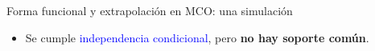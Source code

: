 \documentclass[10pt, xcolor=dvipsnames]{beamer}
\begin{document}
\begin{frame}{Forma funcional y extrapolación en MCO: una simulación}
\begin{itemize}
    \item Se cumple \textcolor{blue}{independencia condicional}, pero \textbf{no hay soporte común}.



\end{itemize}
\end{frame}
\end{document}
